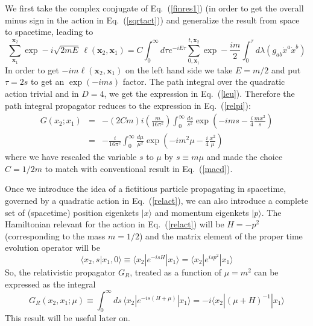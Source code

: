 \documentclass[12pt]{article}
\def\eq#1{{Eq.~(\ref{#1})}}
\def\ket#1{|#1\rangle}                    %
\def\bk#1#2#3{{\langle #1|#2|#3\rangle}}  %
\def\amp#1#2{\langle #1 | #2\rangle}      %
\begin{document}
We first take the complex conjugate of \eq{finres1} (in order to get the overall minus sign in the action in \eq{sqrtact}) and generalize the result from space to spacetime, 
leading to 
\begin{equation}
 \sum_{\bm{x}_1}^{\bm{x}_2} \exp -i\sqrt{2mE}\, \ell(\bm{x}_2,\bm{x}_1) = C \int_0^\infty d\tau  e^{-iE\tau}\sum_{0,\bm{x}_1}^{t,\bm{x}_2}\exp-\frac{im}{2} \int_0^\tau d\lambda \left( g_{ab} \dot x^a\dot  x^b\right)
\label{finres2}
\end{equation} 
In order to get $-im\ell(\bm{x}_2,\bm{x}_1)$ on the left hand side we take $E=m/2$ and put $\tau=2s$ to get an $\exp(-ims)$ factor.
The path integral over the quadratic action trivial and in $D=4$, we get the expression in \eq{leu}.
Therefore the path integral propagator reduces to the expression in \eq{relpi}:
\begin{eqnarray}
 G(x_2;x_1) &=& -(2Cm) i\left(\frac{m}{16\pi^2}\right)\int_0^\infty \frac{ds}{s^2} \exp\left( -ims - \frac{i}{4} \frac{mx^2}{s}\right)\nonumber\\
 &=& - \frac{i}{16\pi^2}\int_0^\infty\frac{d\mu}{\mu^2}  \exp\left( -im^2\mu - \frac{i}{4} \frac{x^2}{\mu}\right)
\label{rpi1}
\end{eqnarray} 
where we have  rescaled the variable $s$ to $\mu$ by $s\equiv m\mu$ and made the choice $C=1/2m$ to  match with conventional result in \eq{macd}.

Once we introduce the idea of a fictitious particle propagating in spacetime, governed by a quadratic action in \eq{relact}, we can also introduce a complete set of (spacetime) position eigenkets $\ket{x}$ and momentum eigenkets $\ket{p}$. The Hamiltonian relevant for the action in  
\eq{relact} will be $H=-p^2$ (corresponding to the mass $m=1/2$) and the matrix element of the proper time evolution operator will be
\begin{equation}
\amp{x_2,s}{x_1,0}\equiv \bk{x_2}{e^{-isH}}{x_1}=\bk{x_2}{e^{isp^2}}{x_1}                                                  
\end{equation} 
So, the relativistic propagator $G_R$, treated as a function of $\mu =m^2$ can be expressed as the integral 
\begin{equation}
 G_R (x_2, x_1; \mu) \equiv \int_0^\infty ds\,  \bk{x_2}{e^{-is (H+\mu)}}{x_1} = - i \bk{x_2}{(\mu + H)^{-1}}{x_1}
 \label{why1}
\end{equation} 
This result will be useful later on.
\end{document}
